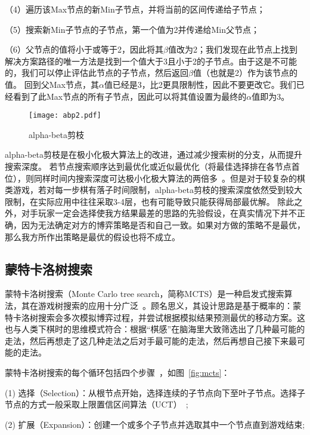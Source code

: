 （4）遍历该Max节点的新Min子节点，并将当前的区间传递给子节点；

（5）搜索新Min子节点的子节点，第一个值为2并传递给Min父节点；

（6）父节点的值将小于或等于2，因此将其$\beta$值改为2；我们发现在此节点上找到解决方案路径的唯一方法是找到一个值大于3且小于2的子节点。由于这是不可能的，我们可以停止评估此节点的子节点，然后返回$\beta$值（也就是2）作为该节点的值。
回到父Max节点，其$\alpha$值已经是3，比2更具限制性，因此不要更改它。我们已经看到了此Max节点的所有子节点，因此可以将其值设置为最终的$\alpha$值即为3。

\begin{figure}[htb]
    \centering
    \texttt{[image: abp2.pdf]}
    \caption[abp2]{%
    alpha-beta剪枝~\cite{russell2010artificial}%
      }
    \label{fig:abp2}
  \end{figure}
\newpage
alpha-beta剪枝是在极小化极大算法上的改进，通过减少搜索树的分支，从而提升搜索深度。
若节点搜索顺序达到最优化或近似最优化（将最佳选择排在各节点首位），则同样时间内搜索深度可达极小化极大算法的两倍多~\cite{KNUTH1975293abp}。但是对于较复杂的棋类游戏，若对每一步棋有落子时间限制，alpha-beta剪枝的搜索深度依然受到较大限制，在实际应用中往往采取3-4层，也有可能导致只能获得局部最优解。
除此之外，对手玩家一定会选择使我方结果最差的思路的先验假设，在真实情况下并不正确，因为无法确定对方的博弈策略是否和自己一致。如果对方做的策略不是最优，那么我方所作出策略是最优的假设也将不成立。

\subsection{蒙特卡洛树搜索}
蒙特卡洛树搜索（Monte Carlo tree search，简称MCTS）是一种启发式搜索算法，其在游戏树搜索的应用十分广泛~\cite{10.1007/978-3-540-75538-8_7}。顾名思义，其设计思路是基于概率的：蒙特卡洛树搜索会多次模拟博弈过程，并尝试根据模拟结果预测最优的移动方案。这也与人类下棋时的思维模式符合：根据“棋感”在脑海里大致筛选出了几种最可能的走法，然后再想走了这几种走法之后对手最可能的走法，然后再想自己接下来最可能的走法。

蒙特卡洛树搜索的每个循环包括四个步骤~\cite{RePEc:wsi:nmncxx:v:04:y:2008:i:03:n:s1793005708001094}，如图~\ref{fig:mcts}：

(1) 选择（Selection）：从根节点开始，选择连续的子节点向下至叶子节点。选择子节点的方式一般采取上限置信区间算法（UCT）~\cite{10.1007/11871842_29};

(2) 扩展（Expansion）：创建一个或多个子节点并选取其中一个节点直到游戏结束;

